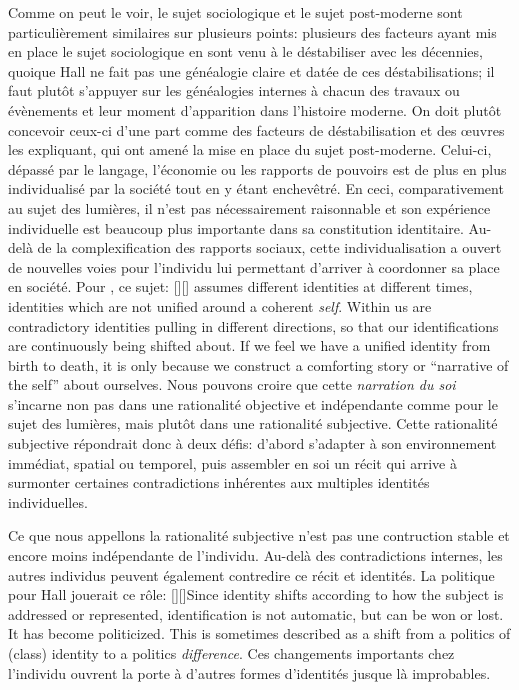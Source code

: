Comme on peut le voir, le sujet sociologique et le sujet post-moderne sont
particulièrement similaires sur plusieurs points: plusieurs des facteurs ayant
mis en place le sujet sociologique en sont venu à le déstabiliser avec les
décennies, quoique Hall ne fait pas une généalogie claire et datée de ces
déstabilisations; il faut plutôt s'appuyer sur les généalogies internes à chacun
des travaux ou évènements et leur moment d'apparition dans l'histoire moderne.
On doit plutôt concevoir ceux-ci d'une part comme des facteurs de
déstabilisation et des œuvres les expliquant, qui ont amené la mise en place du
sujet post-moderne. Celui-ci, dépassé par le langage, l'économie ou les rapports
de pouvoirs est de plus en plus individualisé par la société tout en y étant
enchevêtré. En ceci, comparativement au sujet des lumières, il n'est pas
nécessairement raisonnable et son expérience individuelle est beaucoup plus
importante dans sa constitution identitaire. Au-delà de la complexification des
rapports sociaux, cette individualisation a ouvert de nouvelles voies pour
l'individu lui permettant d'arriver à coordonner sa place en société. Pour
\citeauthor{Hall1996a}, ce sujet:
[{\citeyear[598]{Hall1996a}}][]{\textelp{} assumes
  different identities at different times, identities which are not unified
  around a coherent \emph{self}. Within us are contradictory identities pulling
  in different directions, so that our identifications are continuously being
  shifted about. If we feel we have a unified identity from birth to death, it
  is only because we construct a comforting story or ``narrative of the self''
  about ourselves}. 
Nous pouvons croire que cette \emph{narration du soi} s'incarne non pas dans une rationalité objective et indépendante comme pour le sujet des lumières, mais plutôt dans une rationalité subjective. 
Cette rationalité subjective répondrait donc à deux défis: d'abord s'adapter à son environnement immédiat, spatial ou temporel, puis assembler en soi un récit qui arrive à surmonter certaines contradictions inhérentes aux multiples identités individuelles. 

Ce que nous appellons la rationalité subjective n'est pas une contruction stable et encore moins indépendante de l'individu.
Au-delà des contradictions internes, les autres individus peuvent également contredire ce récit et identités.
La politique pour Hall jouerait ce rôle:
[{\citeyear[610]{Hall1996a}}][]{Since
  identity shifts according to how the subject is addressed or represented,
  identification is not automatic, but can be won or lost. It has become
  politicized. This is sometimes described as a shift from a politics of (class)
  identity to a politics \emph{difference}}. 
Ces changements importants chez l'individu ouvrent la porte à d'autres formes d'identités jusque là improbables.

